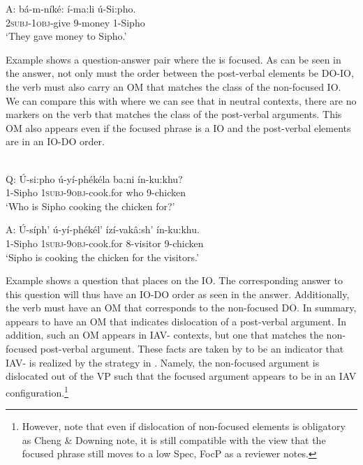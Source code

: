 \documentclass[output=paper,newtxmath,modfonts,nonflat,hidelinks]{langsci/langscibook}
\begin{document}
A: 
{\gll bá-m-níké:      í-ma:li   ú-Si:pho.     \\
\textsc{2subj}{}-\textsc{1obj}{}-give   9-money   1-Sipho\\}
\glt    \-\hspace{0.5cm}`They gave money to Sipho.’ 
\z

Example  shows a question-answer pair where the  is focused. As can be seen in the answer, not only must the order between the post-verbal elements be DO-IO, the verb must also carry an OM that matches the class of the non-focused IO. We can compare this with  where we can see that in neutral contexts, there are no markers on the verb that matches the class of the post-verbal arguments. This OM also appears even if the focused phrase is a IO and the post-verbal elements are in an IO-DO order. 

\ea\label{ex:selvanathan:4}
 \citep[4]{chengdowning2012}\\
Q: \gll  Ú-si:pho    ú-yí-phékéla        ba:ni   ín-ku:khu?\\
1-Sipho       \textsc{1subj}{}-\textsc{9obj}{}-cook.for  who    9-chicken\\ 
\glt \-\hspace{0.5cm}`Who is Sipho cooking the chicken for?’

A: \gll  Ú-síph’   ú-yí-phékél’              ízí-vakâ:sh’    ín-ku:khu.\\
	1-Sipho  \textsc{1subj}{}-\textsc{9obj}{}-cook.for    8-visitor    9-chicken\\
\glt \-\hspace{0.5cm}`Sipho is cooking the chicken for the visitors.’
\z

Example  shows a question that places  on the IO. The corresponding answer to this question will thus have an IO-DO order as seen in the answer. Additionally, the verb must have an OM that corresponds to the non-focused DO. In summary,  appears to have an OM that indicates dislocation of a post-verbal argument. In addition, such an OM appears in IAV- contexts, but one that matches the non-focused post-verbal argument. These facts are taken by \citet{chengdowning2012} to be an indicator that  IAV- is realized by the strategy in . Namely, the non-focused argument is dislocated out of the VP such that the focused argument appears to be in an IAV configuration.\footnote{However, note that even if dislocation of non-focused elements is obligatory as Cheng \& Downing note, it is still compatible with the view that the focused phrase still moves to a low Spec, FocP as a reviewer notes.} 
\end{document}

